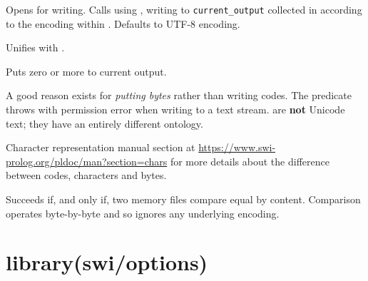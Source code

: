 \begin{description}
Opens  for writing. Calls  using , writing to
\verb$current_output$ collected in  according to the encoding
within . Defaults to UTF-8 encoding.

Unifies  with .

Puts zero or more  to current output.

A good reason exists for \textit{putting bytes} rather than writing codes.
The  predicate throws with permission error when writing
to a text stream.  are \textbf{not} Unicode text; they have an
entirely different ontology.

\begin{tags}
Character representation manual section
at \url{https://www.swi-prolog.org/pldoc/man?section=chars} for more
details about the difference between codes, characters and bytes.
\end{tags}

Succeeds if, and only if, two memory files compare equal by
content. Comparison operates byte-by-byte and so ignores any
underlying encoding.
\end{description}

\chapter{library(swi/options)}\label{sec:options}

